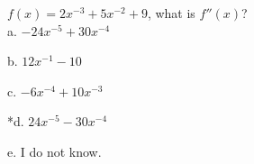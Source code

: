 
\( f(x) = 2x^{-3}+5x^{-2}+9 \), what is \( f''(x) \)?\\

a. \( -24x^{-5}+30x^{-4} \) 

b. \( 12x^{-1} - 10 \)

c. \( -6x^{-4} + 10x^{-3} \)

*d. \( 24x^{-5} - 30x^{-4} \)

e. I do not know.\\
